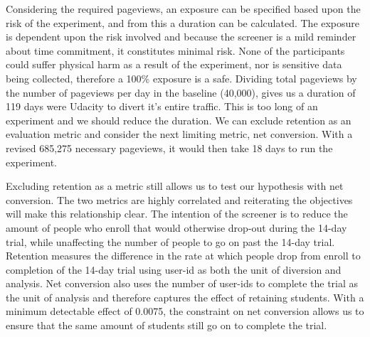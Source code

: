 \documentclass[paper=a4, fontsize=11pt]{scrartcl} %
\numberwithin{equation}{section} %
\numberwithin{figure}{section} %
\numberwithin{table}{section} %
\begin{document}
Considering the required pageviews, an exposure can be specified based upon the risk of the experiment, and from this a duration can be calculated.  The exposure is dependent upon the risk involved and because the screener is a mild reminder about time commitment, it constitutes minimal risk.  None of the participants could suffer physical harm as a result of the experiment, nor is sensitive data being collected, therefore a 100\% exposure is a safe.  Dividing total pageviews by the number of pageviews per day in the baseline (40,000), gives us a duration of 119 days were Udacity to divert it's entire traffic.  This is too long of an experiment and we should reduce the duration.  We can exclude retention as an evaluation metric and consider the next limiting metric, net conversion.  With a revised 685,275 necessary pageviews, it would then take 18 days to run the experiment. \newline

Excluding retention as a metric still allows us to test our hypothesis with net conversion.  The two metrics are highly correlated and reiterating the objectives will make this relationship clear. The intention of the screener is to reduce the amount of people who enroll that would otherwise drop-out during the 14-day trial, while unaffecting the number of people to go on past the 14-day trial.  Retention measures the difference in the rate at which people drop from enroll to completion of the 14-day trial using user-id as both the unit of diversion and analysis.  Net conversion also uses the number of user-id\textquotesingle s to complete the trial as the unit of analysis and therefore captures the effect of retaining students.  With a minimum detectable effect of 0.0075, the constraint on net conversion allows us to ensure that the same amount of students still go on to complete the trial. \newline

\end{document}
